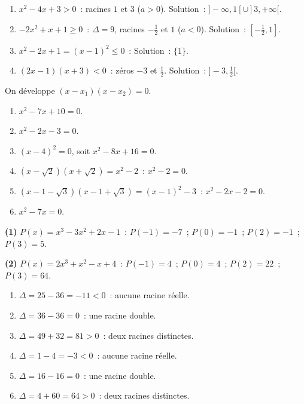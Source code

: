 
\begin{enumerate}
  \item $x^2-4x+3>0$~: racines $1$ et $3$ ($a>0$). Solution~: $]-\infty,1[\cup]3,+\infty[$.
  \item $-2x^2+x+1\geq0$~: $\Delta=9$, racines $-\frac{1}{2}$ et $1$ ($a<0$).
        Solution~: $[-\frac{1}{2},1]$.
  \item $x^2-2x+1=(x-1)^2\leq0$~: Solution~: $\{1\}$.
  \item $(2x-1)(x+3)<0$~: z\'eros $-3$ et $\frac{1}{2}$.
        Solution~: $]-3,\frac{1}{2}[$.
\end{enumerate}


On d\'eveloppe $(x-x_1)(x-x_2)=0$.
\begin{enumerate}
  \item $x^2-7x+10=0$.
  \item $x^2-2x-3=0$.
  \item $(x-4)^2=0$, soit $x^2-8x+16=0$.
  \item $(x-\sqrt2)(x+\sqrt2)=x^2-2$~: $x^2-2=0$.
  \item $(x-1-\sqrt3)(x-1+\sqrt3)=(x-1)^2-3$~: $x^2-2x-2=0$.
  \item $x^2-7x=0$.
\end{enumerate}


\textbf{(1)} $P(x)=x^3-3x^2+2x-1$~:
$P(-1)=-7$~; $P(0)=-1$~; $P(2)=-1$~; $P(3)=5$.

\textbf{(2)} $P(x)=2x^3+x^2-x+4$~:
$P(-1)=4$~; $P(0)=4$~; $P(2)=22$~; $P(3)=64$.


\begin{enumerate}
  \item $\Delta=25-36=-11<0$~: aucune racine r\'eelle.
  \item $\Delta=36-36=0$~: une racine double.
  \item $\Delta=49+32=81>0$~: deux racines distinctes.
  \item $\Delta=1-4=-3<0$~: aucune racine r\'eelle.
  \item $\Delta=16-16=0$~: une racine double.
  \item $\Delta=4+60=64>0$~: deux racines distinctes.
\end{enumerate}

